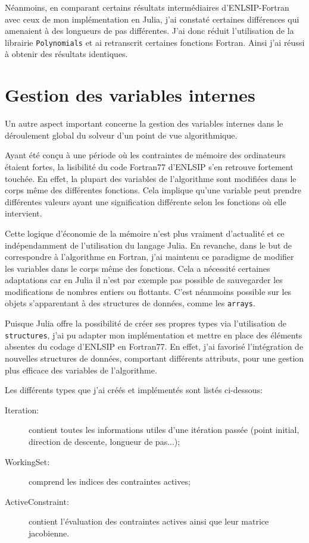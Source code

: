 Néanmoins, en comparant certains résultats intermédiaires d'ENLSIP-Fortran avec ceux de mon implémentation en Julia, j'ai constaté certaines différences qui amenaient à 
des longueurs de pas différentes. J'ai donc réduit l'utilisation de la librairie \texttt{Polynomials} et ai retranscrit certaines fonctions Fortran. Ainsi j'ai réussi 
à obtenir des résultats identiques.


\section{Gestion des variables internes}

Un autre aspect important concerne la gestion des variables internes dans le déroulement global du solveur d'un point de vue algorithmique.

Ayant été con\c cu à une période où les contraintes de mémoire des ordinateurs étaient fortes, la lisibilité du code Fortran77 d'ENLSIP s'en retrouve fortement 
touchée.
En effet, la plupart des variables de l'algorithme sont modifiées dans le corps même des différentes fonctions. Cela implique qu'une variable peut prendre différentes valeurs ayant 
une signification différente selon les fonctions où elle intervient.

Cette logique d'économie de la mémoire n'est plus vraiment d'actualité et ce indépendamment de l'utilisation du langage Julia. En revanche, dans le but de correspondre à l'algorithme en Fortran,
j'ai maintenu ce paradigme de modifier les variables dans le corps même des fonctions. Cela a nécessité certaines adaptations car en Julia il n'est par exemple pas possible de sauvegarder
les modifications de nombres entiers ou flottants. C'est néanmoins possible sur les objets s'apparentant à des structures de données, comme les \texttt{arrays}.

Puisque Julia offre la possibilité de créer ses propres types via l'utilisation de \texttt{structures}, j'ai pu adapter mon implémentation et mettre en place des éléments
absentes du codage d'ENLSIP en Fortran77. En effet, j'ai favorisé l'intégration de nouvelles structures de données, comportant différents attributs, pour une gestion plus efficace des variables de l'algorithme.

Les différents types que j'ai créés et implémentés sont listés ci-dessous:
\begin{description}
    \item[Iteration:] contient toutes les informations utiles d'une itération passée (point initial, direction de descente, longueur de pas...);
    \item[WorkingSet:] comprend les indices des contraintes actives;
    \item[ActiveConstraint:] contient l'évaluation des contraintes actives ainsi que leur matrice jacobienne.
\end{description}

